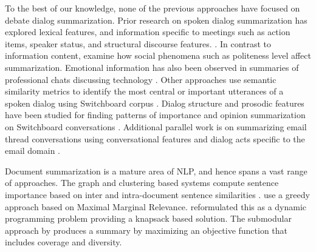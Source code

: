 \documentclass[11pt]{article}
\begin{document}
 To the best of our knowledge,
none of the previous approaches have focused on debate dialog
summarization. Prior research on spoken dialog summarization has
explored lexical features, and information specific to meetings such
as action items, speaker status, and structural discourse
features. \cite{Zechner01,Murrayetal06,Whittakeretal12,Janinetal04,Carletta07}. In
contrast to information content,  examine how social
phenomena such as politeness level affect summarization. Emotional
information has also been observed in summaries of professional chats
discussing technology \cite{ZhouHovy05}.  Other approaches use
semantic similarity metrics to identify the most central or important
utterances of a spoken dialog using Switchboard corpus
\cite{GurevychStrube04}.  Dialog structure and prosodic features have
been studied for finding patterns of importance and opinion
summarization on Switchboard conversations
\cite{Wang2011,ward2013patterns}. Additional parallel work is on
summarizing email thread conversations using conversational features
and dialog acts specific to the email domain
\cite{Murray08summarizingspoken,carenini2014}.
 



 Document summarization is a mature area
of NLP, and hence spans a vast range of approaches. The graph and
clustering based systems compute sentence importance based on inter
and intra-document sentence similarities
\cite{Mihalcea04TextRank,erkan2004lexrank,Ganesan}. \cite{Carbonell1998} use
a greedy approach based on Maximal Marginal
Relevance. \cite{McDonald2007} reformulated this as a dynamic
programming problem providing a knapsack based solution. The
submodular approach by \cite{Lin2011} produces a summary by maximizing
an objective function that includes coverage and diversity.
\end{document}
